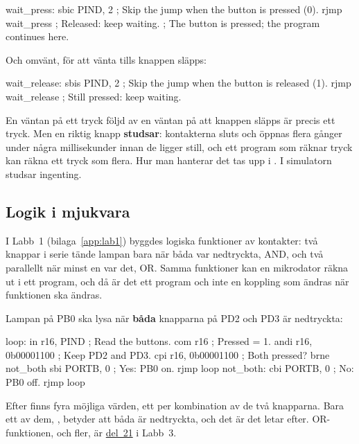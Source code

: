 \begin{asmcode}
wait_press:
    sbic PIND, 2                    ; Skip the jump when the button is pressed (0).
    rjmp wait_press                 ; Released: keep waiting.
    ; The button is pressed; the program continues here.
\end{asmcode}

\noindent Och omvänt, för att vänta tills knappen släpps:

\begin{asmcode}
wait_release:
    sbis PIND, 2                    ; Skip the jump when the button is released (1).
    rjmp wait_release               ; Still pressed: keep waiting.
\end{asmcode}

\noindent En väntan på ett tryck följd av en väntan på att knappen släpps är precis ett tryck. Men
en riktig knapp \textbf{studsar}: kontakterna sluts och öppnas flera gånger under några
millisekunder innan de ligger still, och ett program som räknar tryck kan räkna ett tryck som
flera. Hur man hanterar det tas upp i . I simulatorn studsar ingenting.

\subsection{Logik i mjukvara}
\label{c10:b6}
I Labb~1 (bilaga~\ref{app:lab1}) byggdes logiska funktioner av kontakter: två knappar i serie
tände lampan bara när båda var nedtryckta, AND, och två parallellt när minst en var det, OR. Samma
funktioner kan en mikrodator räkna ut i ett program, och då är det ett program och inte en
koppling som ändras när funktionen ska ändras.

Lampan på PB0 ska lysa när \textbf{båda} knapparna på PD2 och PD3 är nedtryckta:

\begin{asmcode}
loop:
    in r16, PIND                    ; Read the buttons.
    com r16                         ; Pressed = 1.
    andi r16, 0b00001100            ; Keep PD2 and PD3.
    cpi r16, 0b00001100             ; Both pressed?
    brne not_both
    sbi PORTB, 0                    ; Yes: PB0 on.
    rjmp loop
not_both:
    cbi PORTB, 0                    ; No: PB0 off.
    rjmp loop
\end{asmcode}

\noindent Efter  finns fyra möjliga värden, ett per kombination av de två knapparna.
Bara ett av dem, , betyder att båda är nedtryckta, och det är det  letar
efter. OR-funktionen, och fler, är \hyperref[lab3:d21]{del~21} i Labb~3.

